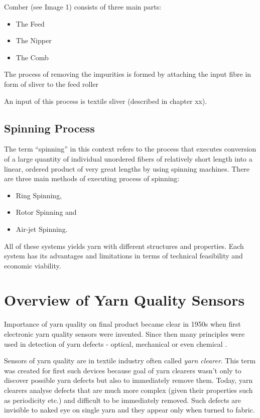 \documentclass[twoside]{ctuthesis}
\theoremstyle{plain}
\theoremstyle{definition}
\theoremstyle{note}
\begin{document}
Comber (see Image 1) consists of three main parts: 
\begin{itemize}
	\setlength{\itemsep}{5pt}
\item The Feed

\item The Nipper

\item The Comb
\end{itemize}
The process of removing the impurities is formed by attaching the input fibre in form of sliver to the feed roller

An input of this process is textile sliver (described in chapter xx).
\subsection{Spinning Process}
\label{spinningProcesses}
The term “spinning” in this context refers to the process that executes conversion of a large quantity of individual unordered fibers of relatively short length into a linear, ordered product of very great lengths by using spinning machines. There are three main methods of executing process of spinning:
\begin{itemize}
	\setlength{\itemsep}{5pt}
\item Ring Spinning,

\item Rotor Spinning and

\item Air-jet Spinning.
\end{itemize}
All of these systems yields yarn with different structures and properties. Each system has its advantages and limitations in terms of technical feasibility and economic viability.
\section{Overview of Yarn Quality Sensors}
Importance of yarn quality on final product became clear in 1950s when first electronic yarn quality sensors were invented. Since then many principles were used in detection of yarn defects - optical, mechanical or even chemical \cite{cite:1}.

Sensors of yarn quality are in textile industry often called \textit{yarn clearer}. This term was created for first such devices because goal of yarn clearers wasn't only to discover possible yarn defects but also to immediately remove them. Today, yarn clearers analyse defects that are much more complex (given their properties such as periodicity etc.) and difficult to be immediately removed. Such defects are invisible to naked eye on single yarn and they appear only when turned to fabric.
\end{document}
